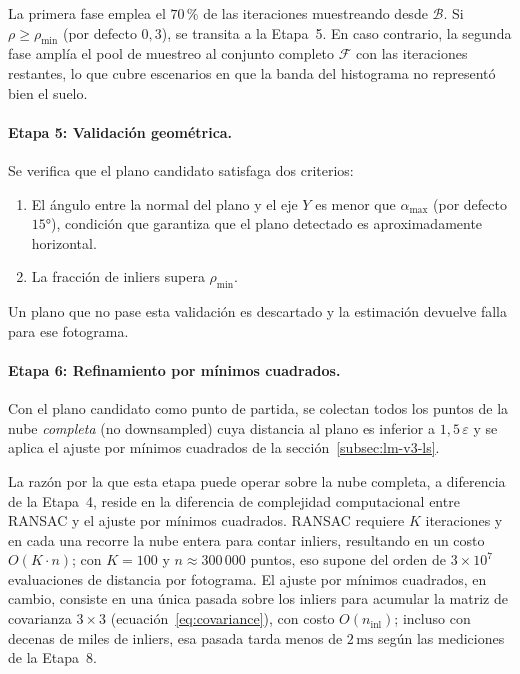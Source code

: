 La primera fase emplea el $70\,$\% de las iteraciones muestreando desde $\mathcal{B}$.
Si $\rho \geq \rho_{\min}$ (por defecto $0{,}3$), se transita a la Etapa~5.
En caso contrario, la segunda fase amplía el pool de muestreo al conjunto
completo $\mathcal{F}$ con las iteraciones restantes, lo que cubre escenarios
en que la banda del histograma no representó bien el suelo.

\paragraph{Etapa 5: Validación geométrica.}
Se verifica que el plano candidato satisfaga dos criterios:
\begin{enumerate}
  \item El ángulo entre la normal del plano y el eje $Y$ es menor que
        $\alpha_{\max}$ (por defecto $15°$), condición que garantiza que
        el plano detectado es aproximadamente horizontal.
  \item La fracción de inliers supera $\rho_{\min}$.
\end{enumerate}
Un plano que no pase esta validación es descartado y la estimación devuelve
falla para ese fotograma.

\paragraph{Etapa 6: Refinamiento por mínimos cuadrados.}
Con el plano candidato como punto de partida, se colectan todos los puntos
de la nube \emph{completa} (no downsampled) cuya distancia al plano es
inferior a $1{,}5\,\varepsilon$ y se aplica el ajuste por mínimos cuadrados de la
sección~\ref{subsec:lm-v3-ls}.

La razón por la que esta etapa puede operar sobre la nube completa, a
diferencia de la Etapa~4, reside en la diferencia de complejidad
computacional entre RANSAC y el ajuste por mínimos cuadrados. RANSAC
requiere $K$ iteraciones y en cada una recorre la nube entera para contar
inliers, resultando en un costo $O(K \cdot n)$; con $K = 100$ y
$n \approx 300\,000$ puntos, eso supone del orden de $3 \times 10^7$
evaluaciones de distancia por fotograma. El ajuste por mínimos cuadrados,
en cambio, consiste en una única pasada sobre los inliers para acumular la
matriz de covarianza $3 \times 3$ (ecuación~\ref{eq:covariance}), con costo
$O(n_{\mathrm{inl}})$; incluso con decenas de miles de inliers, esa pasada
tarda menos de $2\,\text{ms}$ según las mediciones de la Etapa~8.

